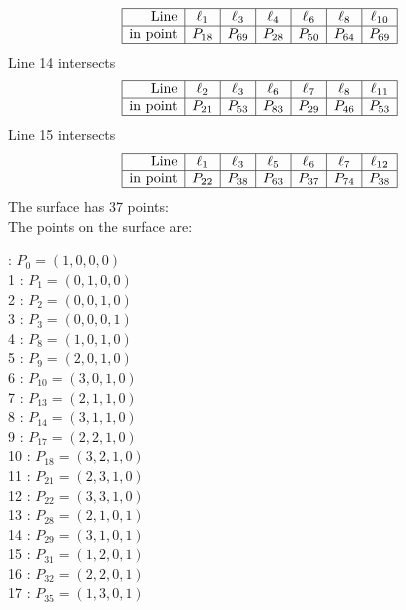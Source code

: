 \documentclass{article}
\begin{document}
{$$
\begin{array}{|r*{6}{|c}|}
\hline
\mbox{Line}  & \ell_{1} & \ell_{3} & \ell_{4} & \ell_{6} & \ell_{8} & \ell_{10}\\
\hline
\mbox{in point}  & P_{18} & P_{69} & P_{28} & P_{50} & P_{64} & P_{69}\\
\hline
\end{array}
$$
Line 14 intersects 
$$
\begin{array}{|r*{6}{|c}|}
\hline
\mbox{Line}  & \ell_{2} & \ell_{3} & \ell_{6} & \ell_{7} & \ell_{8} & \ell_{11}\\
\hline
\mbox{in point}  & P_{21} & P_{53} & P_{83} & P_{29} & P_{46} & P_{53}\\
\hline
\end{array}
$$
Line 15 intersects 
$$
\begin{array}{|r*{6}{|c}|}
\hline
\mbox{Line}  & \ell_{1} & \ell_{3} & \ell_{5} & \ell_{6} & \ell_{7} & \ell_{12}\\
\hline
\mbox{in point}  & P_{22} & P_{38} & P_{63} & P_{37} & P_{74} & P_{38}\\
\hline
\end{array}
$$
The surface has 37 points:\\
The points on the surface are:\\
\begin{multicols}{3}
 : $P_{0}=( 1, 0, 0, 0 )$\\
1 : $P_{1}=( 0, 1, 0, 0 )$\\
2 : $P_{2}=( 0, 0, 1, 0 )$\\
3 : $P_{3}=( 0, 0, 0, 1 )$\\
4 : $P_{8}=( 1, 0, 1, 0 )$\\
5 : $P_{9}=( 2, 0, 1, 0 )$\\
6 : $P_{10}=( 3, 0, 1, 0 )$\\
7 : $P_{13}=( 2, 1, 1, 0 )$\\
8 : $P_{14}=( 3, 1, 1, 0 )$\\
9 : $P_{17}=( 2, 2, 1, 0 )$\\
10 : $P_{18}=( 3, 2, 1, 0 )$\\
11 : $P_{21}=( 2, 3, 1, 0 )$\\
12 : $P_{22}=( 3, 3, 1, 0 )$\\
13 : $P_{28}=( 2, 1, 0, 1 )$\\
14 : $P_{29}=( 3, 1, 0, 1 )$\\
15 : $P_{31}=( 1, 2, 0, 1 )$\\
16 : $P_{32}=( 2, 2, 0, 1 )$\\
17 : $P_{35}=( 1, 3, 0, 1 )$\\

\end{multicols}}
\end{document}
